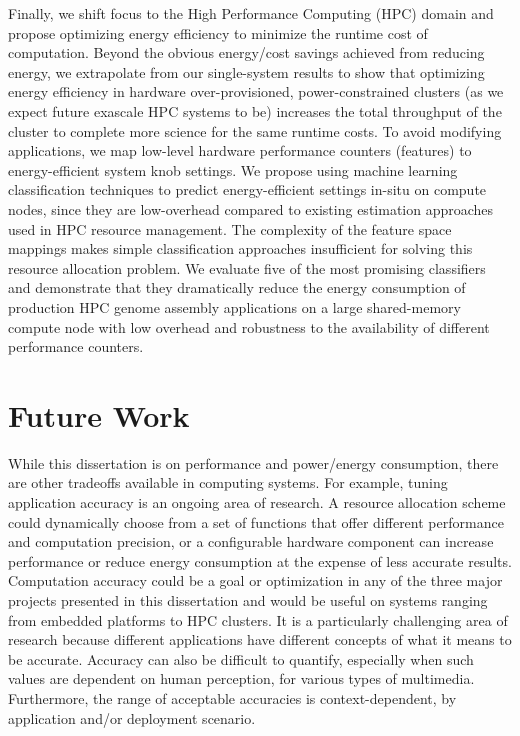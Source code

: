 Finally, we shift focus to the High Performance Computing (HPC) domain and propose optimizing energy efficiency to minimize the runtime cost of computation.
Beyond the obvious energy/cost savings achieved from reducing energy, we extrapolate from our single-system results to show that optimizing energy efficiency in hardware over-provisioned, power-constrained clusters (as we expect future exascale HPC systems to be) increases the total throughput of the cluster to complete more science for the same runtime costs.
To avoid modifying applications, we map low-level hardware performance counters (features) to energy-efficient system knob settings.
We propose using machine learning classification techniques to predict energy-efficient settings in-situ on compute nodes, since they are low-overhead compared to existing estimation approaches used in HPC resource management.
The complexity of the feature space mappings makes simple classification approaches insufficient for solving this resource allocation problem.
We evaluate five of the most promising classifiers and demonstrate that they dramatically reduce the energy consumption of production HPC genome assembly applications on a large shared-memory compute node with low overhead and robustness to the availability of different performance counters.


\section{Future Work}

While this dissertation is on performance and power/energy consumption, there are other tradeoffs available in computing systems.
For example, tuning application accuracy is an ongoing area of research.
A resource allocation scheme could dynamically choose from a set of functions that offer different performance and computation precision, or a configurable hardware component can increase performance or reduce energy consumption at the expense of less accurate results.
Computation accuracy could be a goal or optimization in any of the three major projects presented in this dissertation and would be useful on systems ranging from embedded platforms to HPC clusters.
It is a particularly challenging area of research because different applications have different concepts of what it means to be accurate.
Accuracy can also be difficult to quantify, especially when such values are dependent on human perception, \eg for various types of multimedia.
Furthermore, the range of acceptable accuracies is context-dependent, \eg by application and/or deployment scenario.

